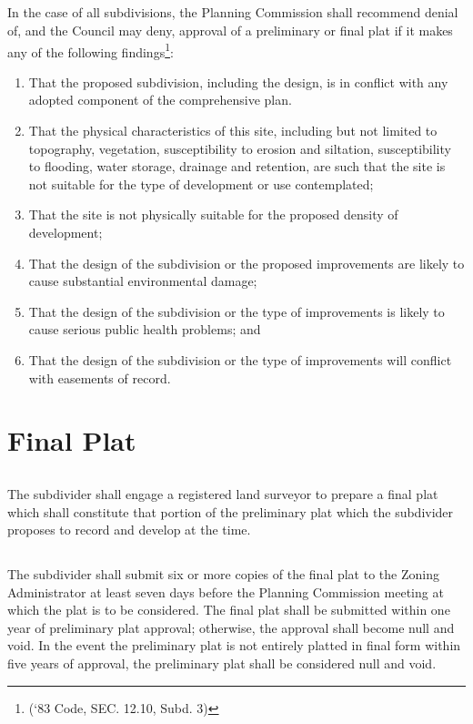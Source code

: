 \subsection{}
In the case of all subdivisions, the Planning Commission shall recommend denial of, and the Council may deny, approval of a preliminary or final plat if it makes any of the following findings\footnote{(‘83 Code, SEC. 12.10, Subd. 3)}:
\begin{enumerate}[{\indent}1)]
    \item That the proposed subdivision, including the design, is in conflict with any adopted component of the comprehensive plan.
    \item That the physical characteristics of this site, including but not limited to topography, vegetation, susceptibility to erosion and siltation, susceptibility to flooding, water storage, drainage and retention, are such that the site is not suitable for the type of development or use contemplated;
    \item That the site is not physically suitable for the proposed density of development;
    \item That the design of the subdivision or the proposed improvements are likely to cause substantial environmental damage;
    \item That the design of the subdivision or the type of improvements is likely to cause serious public health problems; and
    \item That the design of the subdivision or the type of improvements will conflict with easements of record.
\end{enumerate}

\section{Final Plat}
\subsection{}
The subdivider shall engage a registered land surveyor to prepare a final plat which shall constitute that portion of the preliminary plat which the subdivider proposes to record and develop at the time.
\subsection{}
The subdivider shall submit six or more copies of the final plat to the Zoning Administrator at least seven days before the Planning Commission meeting at which the plat is to be considered.  The final plat shall be submitted within one year of preliminary plat approval; otherwise, the approval shall become null and void.  In the event the preliminary plat is not entirely platted in final form within five years of approval, the preliminary plat shall be considered null and void.
